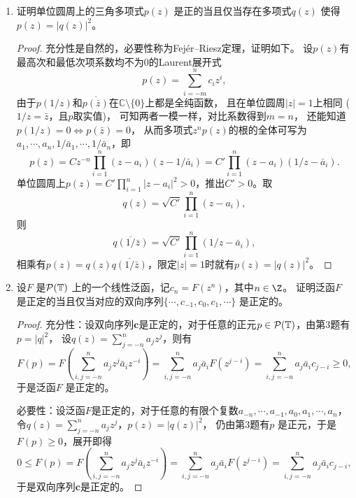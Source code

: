 \begin{enumerate}
\begin{proof}
    $ (2)\Rightarrow(1) $：对于任意的有限个复数$ a_{-n},\cdots,a_{-1},a_{0},a_{1},\cdots,a_{n} $，我们有
    $$
     \sum_{j,k=-n}^{n}{c_{j-k}a_{j}\bar{a}_{k}} = \sum_{j,k=-n}^{n}{\int_{\T}{z^{j-k}\,\mathrm{d}\mu(z)}\,a_{j}\bar{a}_{k}} 
     = \int_{\T}{\Big|\sum_{j=-n}^{n}{a_{j}z^{j}}\Big|^{2}\mathrm{d}\mu(z)}\geqslant 0.\qedhere
    $$ 
\end{proof}

\item[3]
证明单位圆周上的三角多项式$p(z)$ 是正的当且仅当存在多项式$q(z)$ 使得$p(z)=|q(z)|^{2}$。
\begin{proof}
    充分性是自然的，必要性称为Fejér--Riesz定理，证明如下。
    设$p(z)$有最高次和最低次项系数均不为$0$的Laurent展开式
    \[p(z)=\sum_{i=-m}^{n}c_iz^i,\]
    由于$p(1/z)$和$\overline{p(\bar{z})}$在$\mathbb{C}\setminus\{0\}$上都是全纯函数，
    且在单位圆周$|z|=1$上相同 ($1/z=\bar{z}$，且$p$取实值)，
    可知两者一模一样，对比系数得到$m=n$，
    还能知道$p(1/z)=0 \Leftrightarrow p(\bar{z})=0$，
    从而多项式$z^np(z)$的根的全体可写为$a_1,\cdots,a_n,1/\bar{a}_1,\cdots,1/\bar{a}_n$，即
    \[p(z)=Cz^{-n}\prod_{i=1}^n(z-a_i)(z-1/\bar{a}_i)
    =C'\prod_{i=1}^n(z-a_i)(1/z-\bar{a}_i).\]
    单位圆周上$p(z)=C'\prod\limits_{i=1}^n|z-a_i|^2>0$，推出$C'>0$。取
    \[q(z)=\sqrt{C'}\prod_{i=1}^n(z-a_i),\]
    则
    \[\overline{q(1/\bar{z})}=\sqrt{C'}\prod_{i=1}^n(1/z-\bar{a}_i),\]
    相乘有$p(z)=q(z)\overline{q(1/\bar{z})}$，限定$|z|=1$时就有$p(z)=|q(z)|^2$。
\end{proof}

\item[4]
设$ F $ 是$ \mathcal{P}(\mathbb{T}) $ 上的一个线性泛函，记$ c_{n}=F(z^{n}) $，其中$ n\in\Z $。
证明泛函$ F $ 是正定的当且仅当对应的双向序列$ \{\cdots,c_{-1},c_{0},c_{1},\cdots\} $ 是正定的。
\begin{proof}
    充分性：设双向序列$\mathbf{c}$是正定的，对于任意的正元$ p\in\mathcal{P}(\mathbb{T}) $，由第3题有$ p=|q|^{2} $，
    设$ q(z) = \sum_{j=-n}^{n}{a_{j}z^{j}} $，则有
    $$
     F(p) = F\left(\sum_{i,j=-n}^{n}{a_{j}z^{j}\bar{a}_{i}z^{-i}}\right) 
     = \sum_{i,j=-n}^{n}{a_{j}\bar{a}_{i}F(z^{j-i})}
     = \sum_{i,j=-n}^{n}{a_{j}\bar{a}_{i}c_{j-i}}\geqslant 0,
    $$ 
    于是泛函$ F $ 是正定的。

    必要性：设泛函$F$是正定的，对于任意的有限个复数$ a_{-n},\cdots,a_{-1},a_{0},a_{1},\cdots,a_{n} $，
    令$ q(z)=\sum_{j=-n}^{n}{a_{j}z^{j}} $，$ p(z)=|q(z)|^{2} $，
    仍由第3题有$ p $ 是正元，于是$ F(p)\geqslant 0 $，展开即得
    $$ 0 \leqslant F(p)=F\left(\sum_{i,j=-n}^{n}a_jz^j\bar{a}_iz^{-i}\right)
    =\sum_{i,j=-n}^{n}a_j\bar{a}_iF(z^{j-i})
    =\sum_{i,j=-n}^{n}{a_{j}\bar{a}_{i}c_{j-i}}, $$
    于是双向序列$\mathbf{c}$是正定的。
\end{proof}


\end{enumerate}
